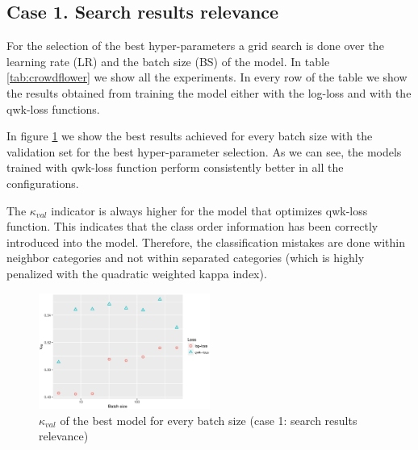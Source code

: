 \documentclass[times,twocolumn,final,authoryear]{elsarticle}
\begin{document}
\subsection{Case 1. Search results relevance}

For the selection of the best hyper-parameters a grid search is done over the learning rate (LR) and the batch size (BS) of the model. In table \ref{tab:crowdflower} we show all the experiments. In every row of the table we show the results obtained from training the model either with the log-loss and with the qwk-loss functions.

In figure \ref{fig:crowdflower} we show the best results achieved for every batch size with the validation set for the best hyper-parameter selection. As we can see, the models trained with qwk-loss function perform consistently better in all the configurations.

The $\kappa_{val}$ indicator is always higher for the model that optimizes qwk-loss function. This indicates that the class order information has been correctly introduced into the model. Therefore, the classification mistakes are done within neighbor categories and not within separated categories (which is highly penalized with the quadratic weighted kappa index).

\begin{figure}[!htb]
	\centering
	\includegraphics[width=0.5\textwidth]{./graphs/crowdflower-results.eps}
	\caption{$\kappa_{val}$ of the best model for every batch size  (case 1: search results relevance)}
	\label{fig:crowdflower}
\end{figure}
\end{document}
